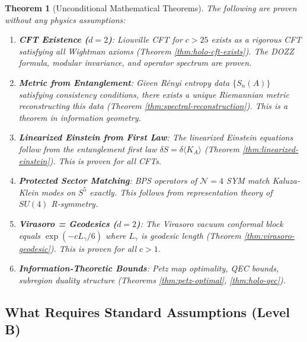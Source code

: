 \documentclass[12pt,a4paper]{article}
\newtheorem{theorem}{Theorem}[section]
\begin{document}
\begin{theorem}[Unconditional Mathematical Theorems]
The following are proven without any physics assumptions:

\begin{enumerate}
    \item \textbf{CFT Existence ($d=2$)}: Liouville CFT for $c > 25$ exists as a rigorous CFT satisfying all Wightman axioms (Theorem \ref{thm:holo-cft-exists}). The DOZZ formula, modular invariance, and operator spectrum are proven.
    
    \item \textbf{Metric from Entanglement}: Given R\'enyi entropy data $\{S_n(A)\}$ satisfying consistency conditions, there exists a unique Riemannian metric reconstructing this data (Theorem \ref{thm:spectral-reconstruction}). This is a theorem in information geometry.
    
    \item \textbf{Linearized Einstein from First Law}: The linearized Einstein equations follow from the entanglement first law $\delta S = \delta\langle K_A\rangle$ (Theorem \ref{thm:linearized-einstein}). This is proven for all CFTs.
    
    \item \textbf{Protected Sector Matching}: BPS operators of $\mathcal{N}=4$ SYM match Kaluza-Klein modes on $S^5$ exactly. This follows from representation theory of $SU(4)$ R-symmetry.
    
    \item \textbf{Virasoro = Geodesics ($d=2$)}: The Virasoro vacuum conformal block equals $\exp(-cL_{\gamma}/6)$ where $L_\gamma$ is geodesic length (Theorem \ref{thm:virasoro-geodesic}). This is proven for all $c > 1$.
    
    \item \textbf{Information-Theoretic Bounds}: Petz map optimality, QEC bounds, subregion duality structure (Theorems \ref{thm:petz-optimal}, \ref{thm:holo-qec}).
\end{enumerate}
\end{theorem}

\subsection{What Requires Standard Assumptions (Level B)}
\end{document}
